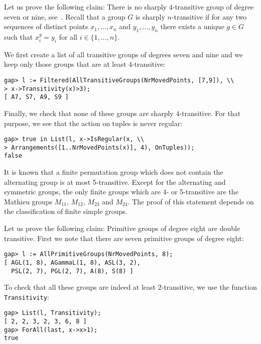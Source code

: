 \begin{example}
Let us prove the following claim: There is no sharply $4$-transitive group of
degree seven or nine, see~\cite[Exercise 1.18]{MR1721031}.
Recall that
a group $G$ is sharply $n$-transitive if for any two
sequences of distinct points $x_1,\dots,x_n$ and
$y_1,\dots,y_n$ there exists a unique $g\in G$ 
such that $x_i^g=y_i$ for all $i\in\{1,\dots,n\}$. 

We first create a
list of all transitive groups of degrees seven and nine and we keep only those
groups that are at least $4$-transitive:
\begin{lstlisting}
gap> l := Filtered(AllTransitiveGroups(NrMovedPoints, [7,9]), \\
> x->Transitivity(x)>3);                                
[ A7, S7, A9, S9 ]
\end{lstlisting}
Finally, we check that none of these groups 
are sharply $4$-transitive. For that purpose, we see that the action on tuples
is never regular:
\begin{lstlisting}
gap> true in List(l, x->IsRegular(x, \\ 
> Arrangements([1..NrMovedPoints(x)], 4), OnTuples));
false
\end{lstlisting}
It is known that a finite permutation group which does not contain the alternating group is at most 5-transitive. 
Except for the alternating and symmetric groups, the only finite groups which are 4- or 5-transitive are the Mathieu groups $M_{11}$, $M_{12}$, $M_{23}$ and $M_{24}$. 
The proof of this statement depends on the classification of finite simple groups.
\end{example}

\begin{example}
Let us prove the following claim: Primitive groups of degree eight are
double transitive. First we note that there are seven primitive groups of
degree eight:
\begin{lstlisting}
gap> l := AllPrimitiveGroups(NrMovedPoints, 8);
[ AGL(1, 8), AGammaL(1, 8), ASL(3, 2), 
  PSL(2, 7), PGL(2, 7), A(8), S(8) ]
\end{lstlisting}
To check that all these groups are indeed at least $2$-transitive, we use the
function \lstinline{Transitivity}:
\begin{lstlisting}
gap> List(l, Transitivity);
[ 2, 2, 3, 2, 3, 6, 8 ]
gap> ForAll(last, x->x>1);                 
true
\end{lstlisting}
\end{example}



